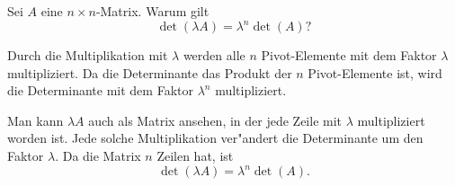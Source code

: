 Sei $A$ eine $n\times n$-Matrix. Warum gilt
\[
\det(\lambda A)=\lambda^n\det(A)?
\]

\begin{loesung}
Durch die Multiplikation mit $\lambda$ werden alle $n$ Pivot-Elemente mit dem
Faktor $\lambda$ multipliziert. Da die Determinante das Produkt der $n$ Pivot-Elemente
ist, wird die Determinante mit dem Faktor $\lambda^n$ multipliziert.

Man kann $\lambda A$ auch als Matrix ansehen, in der jede Zeile mit $\lambda$
multipliziert worden ist. Jede solche Multiplikation ver"andert die Determinante
um den Faktor $\lambda$. Da die Matrix $n$ Zeilen hat, ist
\[
\det(\lambda A)=\lambda^n \det(A).
\]
\end{loesung}

